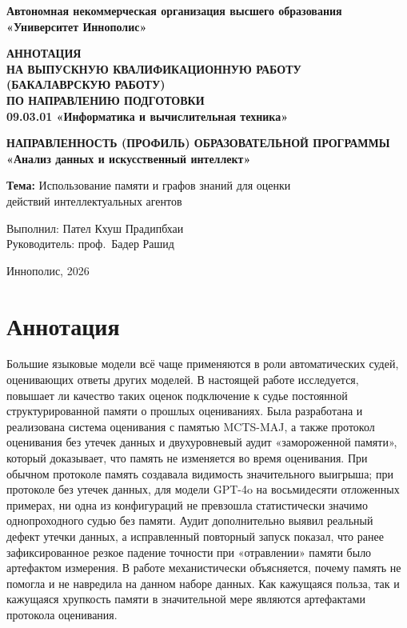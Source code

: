 \documentclass[14pt,a4paper]{extreport}
\begin{document}
\thispagestyle{empty}
\begin{center}
\textbf{Автономная некоммерческая организация высшего образования}\\
\textbf{«Университет Иннополис»}

\vspace{1.5cm}
\textbf{АННОТАЦИЯ}\\
\textbf{НА ВЫПУСКНУЮ КВАЛИФИКАЦИОННУЮ РАБОТУ}\\
\textbf{(БАКАЛАВРСКУЮ РАБОТУ)}\\
\textbf{ПО НАПРАВЛЕНИЮ ПОДГОТОВКИ}\\
\textbf{09.03.01 «Информатика и вычислительная техника»}

\vspace{1cm}
\textbf{НАПРАВЛЕННОСТЬ (ПРОФИЛЬ) ОБРАЗОВАТЕЛЬНОЙ ПРОГРАММЫ}\\
\textbf{«Анализ данных и искусственный интеллект»}

\vspace{1.5cm}
\textbf{Тема:} Использование памяти и графов знаний для оценки\\
действий интеллектуальных агентов

\vspace{1cm}
Выполнил: Пател Кхуш Прадипбхаи\\
Руководитель: проф.\ Бадер Рашид

\vfill
Иннополис, 2026
\end{center}
\clearpage

\setcounter{page}{2}
\tableofcontents
\clearpage

\chapter*{Аннотация}

Большие языковые модели всё чаще применяются в роли автоматических судей, оценивающих ответы других моделей. В настоящей работе исследуется, повышает ли качество таких оценок подключение к судье постоянной структурированной памяти о прошлых оцениваниях. Была разработана и реализована система оценивания с памятью MCTS-MAJ, а также протокол оценивания без утечек данных и двухуровневый аудит «замороженной памяти», который доказывает, что память не изменяется во время оценивания. При обычном протоколе память создавала видимость значительного выигрыша; при протоколе без утечек данных, для модели GPT-4o на восьмидесяти отложенных примерах, ни одна из конфигураций не превзошла статистически значимо однопроходного судью без памяти. Аудит дополнительно выявил реальный дефект утечки данных, а исправленный повторный запуск показал, что ранее зафиксированное резкое падение точности при «отравлении» памяти было артефактом измерения. В работе механистически объясняется, почему память не помогла и не навредила на данном наборе данных. Как кажущаяся польза, так и кажущаяся хрупкость памяти в значительной мере являются артефактами протокола оценивания.
\end{document}
